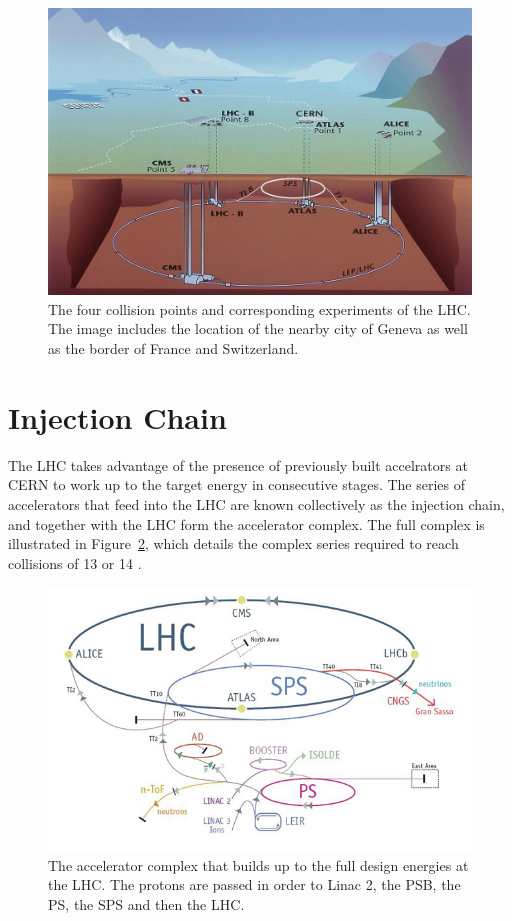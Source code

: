 \begin{figure}
\centering
\includegraphics[width=\fullfig]{figures/cern_locations.jpg}
\caption{The four collision points and corresponding experiments of the \ac{LHC}. The image includes the location of the nearby city of Geneva as well as the border of France and Switzerland.}
\label{fig:cern_locations}
\end{figure}

\section{Injection Chain}
The \ac{LHC} takes advantage of the presence of previously built accelrators at \ac{CERN} to work up to the target energy in consecutive stages.
The series of accelerators that feed into the \ac{LHC} are known collectively as the injection chain, and together with the \ac{LHC} form the accelerator complex.
The full complex is illustrated in Figure~\ref{fig:accelerator_complex}, which details the complex series required to reach collisions of 13 or 14 \TeV. 

\begin{figure}[h]
\centering
\includegraphics[width=\fullfig]{figures/accelerator_complex.jpg}
\caption{The accelerator complex that builds up to the full design energies at the \ac{LHC}. The protons are passed in order to Linac 2, the \acs{PSB}, the \acs{PS}, the \acs{SPS} and then the \ac{LHC}.}
\label{fig:accelerator_complex}
\end{figure}

